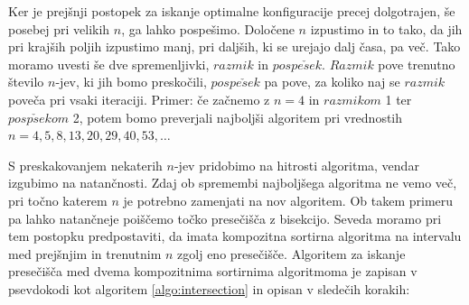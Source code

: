 \documentclass[a4paper,oneside,12pt]{article}
\begin{document}
Ker je prejšnji postopek za iskanje optimalne konfiguracije precej dolgotrajen, še posebej
pri velikih $n$, ga lahko pospešimo. Določene $n$ izpustimo in to tako, da jih pri krajših
poljih izpustimo manj, pri daljših, ki se urejajo dalj časa, pa več. Tako moramo uvesti še
dve spremenljivki, $razmik$ in $pospe\check{s}ek$. $Razmik$ pove trenutno število $n$-jev, ki jih
bomo preskočili, $pospe\check{s}ek$ pa pove, za koliko naj se $razmik$ poveča pri vsaki iteraciji.
Primer: če začnemo z $n = 4$ in $razmikom$ 1 ter $posp\check{s}ekom$ 2, potem bomo preverjali
najboljši algoritem pri vrednostih \mbox{$n = 4, 5, 8, 13, 20, 29, 40, 53,\dots$}

S preskakovanjem nekaterih $n$-jev pridobimo na hitrosti algoritma, vendar izgubimo na
natančnosti. Zdaj ob spremembi najboljšega algoritma ne vemo več, pri točno katerem $n$ je
potrebno zamenjati na nov algoritem. Ob takem primeru pa lahko natančneje poiščemo točko
presečišča z bisekcijo. Seveda moramo pri tem postopku predpostaviti, da imata kompozitna
sortirna algoritma na intervalu med prejšnjim in trenutnim $n$ zgolj eno presečišče.
Algoritem za iskanje presečišča med dvema kompozitnima sortirnima algoritmoma je zapisan v
psevdokodi kot algoritem \ref{algo:intersection} in opisan v sledečih korakih:
\end{document}
